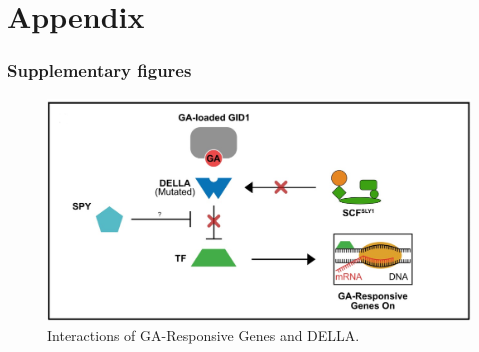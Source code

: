 \documentclass[10pt,a4paper]{article}
\begin{document}
\newpage
\appendix
\setcounter{figure}{0}  
\part*{\Large Appendix}

\section{Supplementary figures}

\begin{figure}[H]
	\centering
	\includegraphics[width=0.7\linewidth]{img/ATH2}
	\caption{Interactions of GA-Responsive Genes and DELLA.}
	\label{fig:dellainteractions}
\end{figure}
\end{document}

